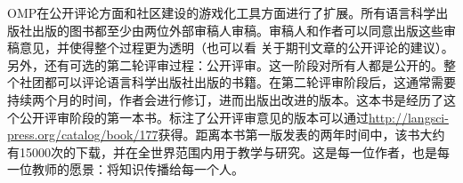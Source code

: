 OMP在公开评论方面和社区建设的游戏化工具方面进行了扩展。所有语言科学出版社出版的图书都至少由两位外部审稿人审稿。审稿人和作者可以同意出版这些审稿意见，并使得整个过程更为透明（也可以看 关于期刊文章的公开评论的建议）。另外，还有可选的第二轮评审过程：公开评审。这一阶段对所有人都是公开的。整个社团都可以评论语言科学出版社出版的书籍。在第二轮评审阶段后，这通常需要持续两个月的时间，作者会进行修订，进而出版出改进的版本。这本书是经历了这个公开评审阶段的第一本书。标注了公开评审意见的版本可以通过\url{http://langsci-press.org/catalog/book/177}获得。距离本书第一版发表的两年时间中，该书大约有15000次的下载，并在全世界范围内用于教学与研究。这是每一位作者，也是每一位教师的愿景：将知识传播给每一个人。

